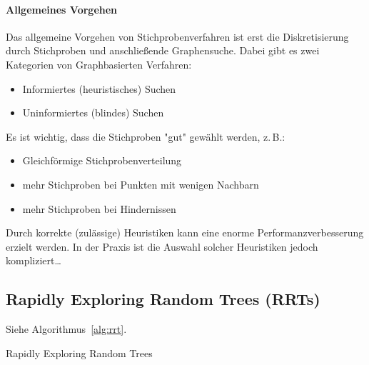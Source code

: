 \documentclass[a4paper, 11pt, accentcolor = tud3b]{tudreport}
\begin{document}
				\paragraph{Allgemeines Vorgehen}
					Das allgemeine Vorgehen von Stichprobenverfahren ist erst die Diskretisierung durch Stichproben und anschließende Graphensuche. Dabei gibt es zwei Kategorien von Graphbasierten Verfahren:
					\begin{itemize}
						\item Informiertes (heuristisches) Suchen
						\item Uninformiertes (blindes) Suchen
					\end{itemize}
					Es ist wichtig, dass die Stichproben "gut" gewählt werden, z.\,B.:
					\begin{itemize}
						\item Gleichförmige Stichprobenverteilung
						\item mehr Stichproben bei Punkten mit wenigen Nachbarn
						\item mehr Stichproben bei Hindernissen
					\end{itemize}
				
					Durch korrekte (zulässige) Heuristiken kann eine enorme Performanzverbesserung erzielt werden. In der Praxis ist die Auswahl solcher Heuristiken jedoch kompliziert\dots

			\subsection{Rapidly Exploring Random Trees (RRTs)}
				Siehe Algorithmus~\ref{alg:rrt}.
				
				\begin{algorithm}
					\caption{Rapidly Exploring Random Trees}
					\label{alg:rrt}
				\end{algorithm}
\end{document}
